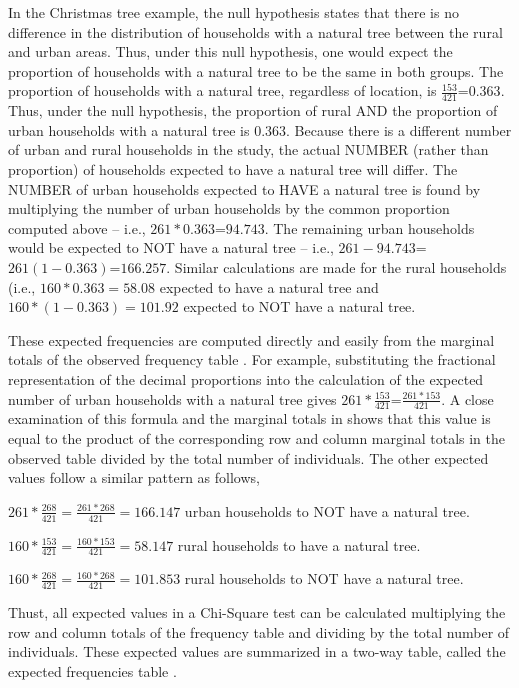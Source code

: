 \documentclass[10pt,openany]{book}\usepackage[]{graphicx}\usepackage[]{color}
\begin{document}
In the Christmas tree example, the null hypothesis states that there is no difference in the distribution of households with a natural tree between the rural and urban areas.  Thus, under this null hypothesis, one would expect the proportion of households with a natural tree to be the same in both groups.  The proportion of households with a natural tree, regardless of location, is $\frac{153}{421}$=$0.363$.  Thus, under the null hypothesis, the proportion of rural AND the proportion of urban households with a natural tree is $0.363$.  Because there is a different number of urban and rural households in the study, the actual NUMBER (rather than proportion) of households expected to have a natural tree will differ.  The NUMBER of urban households expected to HAVE a natural tree is found by multiplying the number of urban households by the common proportion computed above -- i.e., $261*0.363$=$94.743$.  The remaining urban households would be expected to NOT have a natural tree -- i.e., $261-94.743$=$261(1-0.363)$=$166.257$.  Similar calculations are made for the rural households (i.e., $160*0.363=58.08$ expected to have a natural tree and $160*(1-0.363)=101.92$ expected to NOT have a natural tree.

These expected frequencies are computed directly and easily from the marginal totals of the observed frequency table .  For example, substituting the fractional representation of the decimal proportions into the calculation of the expected number of urban households with a natural tree gives $261*\frac{153}{421}$=$\frac{261*153}{421}$.  A close examination of this formula and the marginal totals in  shows that this value is equal to the product of the corresponding row and column marginal totals in the observed table divided by the total number of individuals.  The other expected values follow a similar pattern as follows,
\begin{Itemize}
  \item $261*\frac{268}{421}=\frac{261*268}{421}=166.147$ urban households to NOT have a natural tree.
  \item $160*\frac{153}{421}=\frac{160*153}{421}=58.147$ rural households to have a natural tree.
  \item $160*\frac{268}{421}=\frac{160*268}{421}=101.853$ rural households to NOT have a natural tree.
\end{Itemize}

Thust, all expected values in a Chi-Square test can be calculated multiplying the row and column totals of the frequency table and dividing by the total number of individuals.  These expected values are summarized in a two-way table, called the expected frequencies table .
\end{document}
